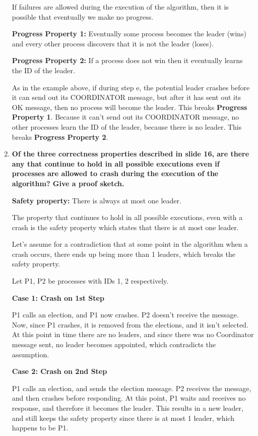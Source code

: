 \documentclass[12pt,a4paper]{article}
\begin{document}
\begin{enumerate}[label=(\alph*)]
If failures are allowed during the execution of the algorithm, then it is possible that eventually we make no progress.

\textbf{Progress Property 1:} Eventually some process becomes the leader (wins) and every other process discovers that it is not the leader (loses).

\textbf{Progress Property 2:} If a process does not win then it eventually learns the ID of the leader.

As in the example above, if during step e, the potential leader crashes before it can send out its COORDINATOR message, but after it has sent out its OK message, then no process will become the leader. This breaks \textbf{Progress Property 1}. Because it can't send out its COORDINATOR message, no other processes learn the ID of the leader, because there is no leader. This breaks \textbf{Progress Property 2}.


\clearpage

\item \textbf{Of the three correctness properties described in slide 16, are there any that continue to hold in all possible executions even if processes are allowed to crash during the execution of the algorithm? Give a proof sketch.}

\textbf{Safety property:} There is always at most one leader.

The property that continues to hold in all possible executions, even with a crash is the safety property which states that there is at most one leader.

Let's assume for a contradiction that at some point in the algorithm when a crash occurs, there ends up being more than 1 leaders, which breaks the safety property. 

Let P1, P2 be processes with IDs 1, 2 respectively. 

\textbf{Case 1: Crash on 1st Step}

P1 calls an election, and P1 now crashes. P2 doesn't receive the message. Now, since P1 crashes, it is removed from the elections, and it isn't selected. At this point in time there are no leaders, and since there was no Coordinator message sent, no leader becomes appointed, which contradicts the assumption.

\textbf{Case 2: Crash on 2nd Step}

P1 calls an election, and sends the election message. P2 receives the message, and then crashes before responding. At this point, P1 waits and receives no response, and therefore it becomes the leader. This results in a new leader, and still keeps the safety property since there is at most 1 leader, which happens to be P1.


\end{enumerate}
\end{document}
